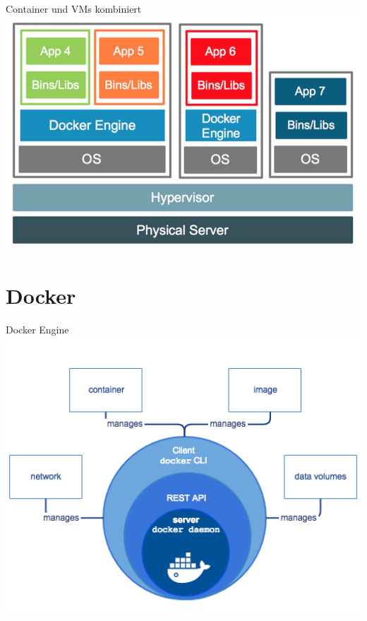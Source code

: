 \documentclass[10pt]{beamer}
\begin{document}
\begin{frame}{Container und VMs kombiniert}
  \includegraphics[width=1\textwidth]{../images/7-container-vm-combined.jpg}
\end{frame}

\section{Docker}

\begin{frame}{Docker Engine}
  \includegraphics[width=1\textwidth]{../images/8-docker-engine.png}
\end{frame}
\end{document}
